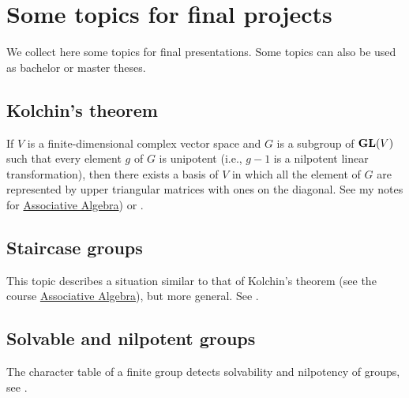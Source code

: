 \section*{Some topics for final projects}

\pagestyle{plain}
\fancyhf{}
\fancyfoot[CE,CO]{\leftmark}
\fancyfoot[LE,RO]{\thepage}

We collect here some topics for final presentations. Some topics
can also be used as bachelor or master theses. 

\subsection*{Kolchin's theorem}

If $V$ is a finite-dimensional complex 
vector space and $G$ is a subgroup of $\mathbf{GL}(V)$ such that every element $g$ of $G$ is unipotent (i.e., $g - 1$ is a nilpotent linear transformation), then there exists a basis of $V$ in which 
all the element of $G$ are represented by upper triangular matrices with ones on the diagonal. See my
notes for \href{https://github.com/vendramin/associative/}{Associative Algebra}) or \cite[Chapter 2]{MR1369573}.

\subsection*{Staircase groups}

This topic describes a situation similar to that of Kolchin's theorem (see the course \href{https://github.com/vendramin/associative/}{Associative Algebra}), but
more general. See \cite[Chapter 5]{MR1369573}.

\subsection*{Solvable and nilpotent groups}

The character table of a finite group
detects solvability and nilpotency of groups, see
\cite[Chapter 6]{MR1369573}.



